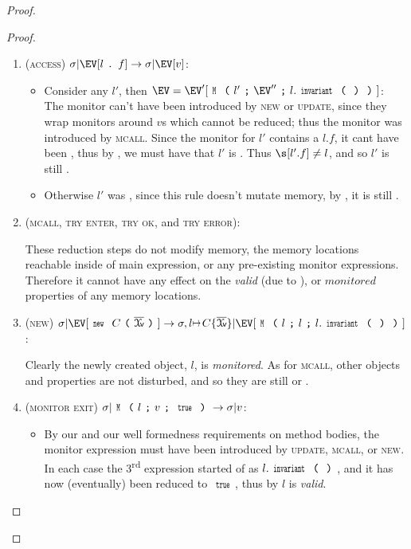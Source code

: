 \begin{proof}
\begin{proof}
\begin{enumerate}
\item (\textsc{access}) $\sigma|\EV[l\singleDot f] \rightarrow \sigma|\EV[v]$:
	\begin{itemize}
		\item Consider any \mony $l'$, then $\EV = \EV'[\M{l'}{\EV''}{l.\invariant}]$:\\
			The monitor can't have been introduced by \textsc{new} or \textsc{update}, since they wrap monitors around $v$s which cannot be reduced; thus the monitor was introduced by \textsc{mcall}.
			Since the monitor for $l'$ contains a $l.f$, it cant have been \CNA, thus by \CFS, we must have that $l'$ is \CNO. 
			Thus $\s[l'.f] \neq l$, and so $l'$ is still \mony.
		\item Otherwise $l'$ was \valid, since this rule doesn't mutate memory, by , it is still \valid.
\end{itemize}

\item (\textsc{mcall}, \textsc{try enter}, \textsc{try ok}, and \textsc{try error}):

	These reduction steps do not modify memory, the memory locations reachable inside of main expression, or any pre-existing monitor expressions. Therefore it cannot have any effect on the \emph{valid} (due to ), or $\mathit{monitored}$ properties of any memory locations.

\item (\textsc{new}) $\sigma|\EV[\Kw{new}\ C\oR\vs\cR]\rightarrow \sigma,l\mapsto C\{\vs\}|\EV[ \M{l}{l}{l.\invariant}]$:

	Clearly the newly created object, $l$, is \emph{monitored}. As for \textsc{mcall}, other objects and properties are not disturbed, and so they are still \valid or \mony.


\item (\textsc{monitor exit}) $\sigma|\M{l}{v}{\Kw{true}}\rightarrow \sigma|v$:
\begin{itemize}
	\item By our \VS and our well formedness requirements on method bodies, the monitor expression must have been introduced by \textsc{update}, \textsc{mcall}, or \textsc{new}. In each case the 3\textsuperscript{rd} expression started of as $l.\invariant$, and it has now (eventually) been reduced to $\Kw{true}$, thus by  $l$ is \emph{valid}.
\end{itemize} 
\end{enumerate}
\end{proof}



\end{proof}
